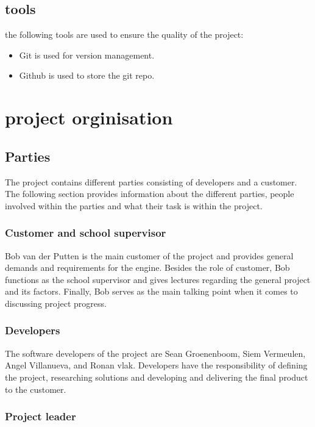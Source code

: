 \documentclass{article} %
\begin{document}
\subsection{tools}
the following tools are used to ensure the quality of the project:
\begin{itemize}
    \item Git is used for version management.
    \item Github is used to store the git repo.
\end{itemize}
\newpage

\section{project orginisation}

\subsection{Parties}
The project contains different parties consisting of developers and a customer. The following section provides information about the different parties, people involved within the parties and what their task is within the project.
\subsubsection{Customer and school supervisor}

Bob van der Putten is the main customer of the project and provides general demands and requirements for the engine. Besides the role of customer, Bob functions as the school supervisor and gives lectures regarding the general project and its factors. Finally, Bob  serves as the main talking point when it comes to discussing project progress.

\subsubsection{Developers}

The software developers of the project are Sean Groenenboom, Siem Vermeulen, Angel Villanueva, and Ronan vlak. Developers have the responsibility of defining the project, researching solutions and developing and delivering the final product to the customer.


\subsubsection{Project leader}
\end{document}
